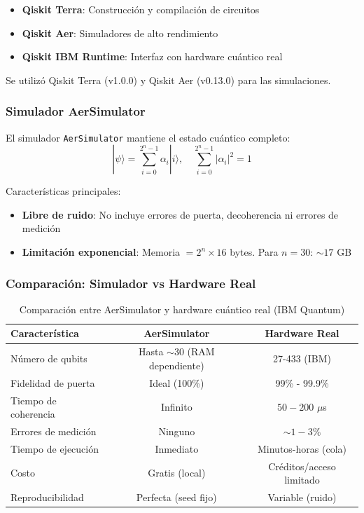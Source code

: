 \documentclass[12pt]{article}
\begin{document}
\begin{itemize}
    \item \textbf{Qiskit Terra}: Construcción y compilación de circuitos
    \item \textbf{Qiskit Aer}: Simuladores de alto rendimiento
    \item \textbf{Qiskit IBM Runtime}: Interfaz con hardware cuántico real
\end{itemize}

Se utilizó Qiskit Terra (v1.0.0) y Qiskit Aer (v0.13.0) para las simulaciones.

\subsubsection{Simulador AerSimulator}

El simulador \texttt{AerSimulator} mantiene el estado cuántico completo:
\begin{equation}
|\psi\rangle = \sum_{i=0}^{2^n-1} \alpha_i |i\rangle, \quad \sum_{i=0}^{2^n-1} |\alpha_i|^2 = 1
\end{equation}

Características principales:
\begin{itemize}
    \item \textbf{Libre de ruido}: No incluye errores de puerta, decoherencia ni errores de medición
    \item \textbf{Limitación exponencial}: Memoria $= 2^n \times 16$ bytes. Para $n=30$: $\sim 17$ GB
\end{itemize}

\subsubsection{Comparación: Simulador vs Hardware Real}

\begin{table}[H]
\centering
\caption{Comparación entre AerSimulator y hardware cuántico real (IBM Quantum)}
\label{tab:sim_vs_hardware}
\begin{tabular}{|l|c|c|}
\hline
\textbf{Característica} & \textbf{AerSimulator} & \textbf{Hardware Real} \\
\hline
\hline
Número de qubits & Hasta $\sim$30 (RAM dependiente) & 27-433 (IBM) \\
\hline
Fidelidad de puerta & Ideal (100\%) & 99\% - 99.9\% \\
\hline
Tiempo de coherencia & Infinito & $50-200$ $\mu$s \\
\hline
Errores de medición & Ninguno & $\sim 1-3\%$ \\
\hline
Tiempo de ejecución & Inmediato & Minutos-horas (cola) \\
\hline
Costo & Gratis (local) & Créditos/acceso limitado \\
\hline
Reproducibilidad & Perfecta (seed fijo) & Variable (ruido) \\
\hline
\end{tabular}
\end{table}
\end{document}
